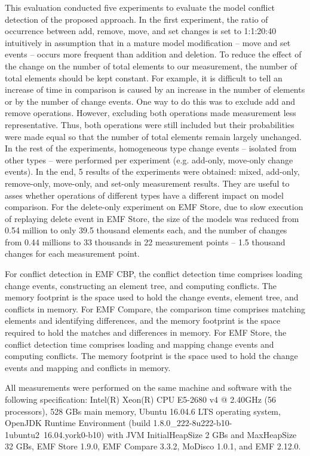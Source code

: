 This evaluation conducted five experiments to evaluate the model conflict detection of the proposed approach. In the first experiment, the ratio of occurrence between \textsf{add}, \textsf{remove}, \textsf{move}, and \textsf{set} changes is set to 1:1:20:40 intuitively in assumption that in a mature model modification -- \textsf{move} and \textsf{set} events -- occurs more frequent than addition and deletion. To reduce the effect of the change on the number of total elements to our measurement, the number of total elements should be kept constant. For example, it is difficult to tell an increase of time in comparison is caused by an increase in the number of elements or by the number of change events. One way to do this was to exclude \textsf{add} and \textsf{remove} operations. However, excluding both operations made measurement less representative. Thus, both operations were still included but their probabilities were made equal so that the number of total elements remain largely unchanged. In the rest of the experiments,
homogeneous type change events -- isolated from other types -- were performed per experiment (e.g. add-only, move-only change events). In the end, 5 results of the experiments were obtained: mixed, add-only, remove-only, move-only, and set-only measurement results. They are useful to asses whether operations of different types have a different impact on model comparison. For the delete-only experiment on EMF Store, due to slow execution of replaying \textsf{delete} event in EMF Store, the size of the models was reduced from 0.54 million to only 39.5 thousand elements each, and the number of changes from 0.44 millions to 33 thousands in 22 measurement points -- 1.5 thousand changes for each measurement point.

For conflict detection in EMF CBP, the conflict detection time comprises loading change events, constructing an element tree, and computing conflicts. The memory footprint is the space used to hold the change events, element tree, and conflicts in memory. For EMF Compare, the comparison time comprises matching elements and identifying differences, and the memory footprint is the space required to hold the matches and differences in memory. For EMF Store, the conflict detection time comprises loading and mapping change events and computing conflicts. The memory footprint is the space used to hold the change events and mapping and conflicts in memory.

All measurements were performed on the same machine and software with the following specification: Intel(R) Xeon(R) CPU E5-2680 v4 @ 2.40GHz (56 processors), 528 GBs main memory, Ubuntu 16.04.6 LTS operating system, OpenJDK Runtime Environment (build 1.8.0\_222-8u222-b10-1ubuntu2~16.04.york0-b10) with JVM \textsf{InitialHeapSize} 2 GBs and \textsf{MaxHeapSize} 32 GBs, EMF Store 1.9.0, EMF Compare 3.3.2, MoDisco 1.0.1, and EMF 2.12.0.

